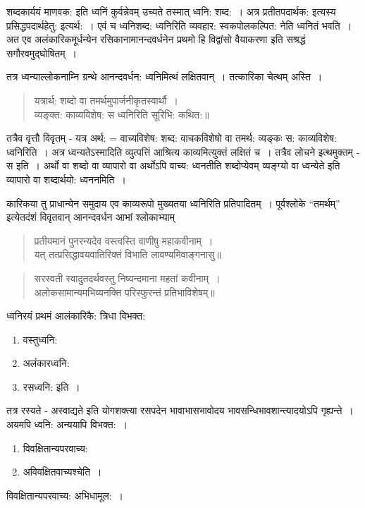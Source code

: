 {शब्दकार्ययं माणवक: इति ध्वनिं कुर्वन्नेवम् उच्यते तस्मात् ध्वनि: शब्द:~। अत्र प्रतीतपदार्थक: इत्यस्य प्रसिद्धपदार्थहेतु: इत्यर्थ:~। एवं च ध्वनिशब्द: ध्वनिरिति व्यवहार: स्वकपोलकल्पित: नेति ध्वनितं भवति~। अत एव अलंकारिकमूर्धन्येन रसिकानामानन्दवर्धनेन प्रथमो हि विद्वांसो वैयाकरणा इति सश्रद्धं सगौरवमुद्घोषितम्~। 

तत्र ध्वन्याल्लोकनाम्नि ग्रन्थे आनन्दवर्धन: ध्वनिमित्थं लक्षितवान्~। तत्कारिका चेत्थम् अस्ति~। 
\begin{verse}
यत्रार्थ: शब्दो वा तमर्थमुपार्जनीकृतस्वार्थौ~। \\
व्यङ्क्त: काव्यविशेष: स ध्वनिरिति सूरिभि: कथित:॥
\end{verse}
तत्रैव वृत्तौ विवृतम् - यत्र अर्थ: = वाच्यविशेष: शब्द: वाचकविशेषो वा तमर्थ: व्यङ्कः स: काव्यविशेष: ध्वनिरिति~। अत्र ध्वन्यतेऽस्मादिति व्युत्पत्तिं आश्रित्य काव्यमित्युक्तं लक्षितं च~। तत्रैव लोचने इत्थमुक्तम् - स इति~। अर्थो वा शब्दो वा व्यापारो वा अर्थोऽपि वाच्य: ध्वनतीति शब्दोप्येवम् व्यङ्ग्यो वा ध्वन्येते इति व्यापारो वा शब्दार्थयो: ध्वननमिति~। 

कारिकया तु प्राधान्येन समुदाय एव काव्यरूपो मुख्यतया ध्वनिरिति प्रतिपादितम्~। पूर्वश्लोके “तमर्थम्” इत्येतदंशं विवृतवान् आनन्दवर्धन आभां श्लोकाभ्याम् 
\begin{verse}
प्रतीयमानं पुनरन्यदेव वस्त्वस्ति वाणीषु महाकवीनाम्~। \\
यत् तत्प्रसिद्धावयवातिरिक्तं विभाति लावण्यमिवाङ्गनासु॥
\end{verse}
\begin{verse}
सरस्वती स्वादुतदर्थवस्तु निष्यन्दमाना महतां कवीनाम्~। \\
अलोकसामान्यमभिव्यनक्ति परिस्फुरन्तं प्रतिभाविशेषम्॥
\end{verse}
ध्वनिरयं प्रथमं आलंकारिकै: त्रिधा विभक्त:
\begin{enumerate}
\itemsep=0pt
\item वस्तुध्वनि:
\item अलंकारध्वनि:
\item रसध्वनि: इति~। 
\end{enumerate}

तत्र रस्यते - अस्वाद्यते इति योगशक्त्या रसपदेन भावाभासभावोदय भावसन्धिभाव\-शान्त्यादयोऽपि गृह्यन्ते~। अयमपि ध्वनि: अन्ययापि विभक्त:~। 
\begin{enumerate}
\itemsep=0pt
\item विवक्षितान्यपरवाच्य:
\item अविवक्षितवाच्यश्चेति~। 
\end{enumerate}
विवक्षितान्यपरवाच्य: अभिधामूल:~। 

}
